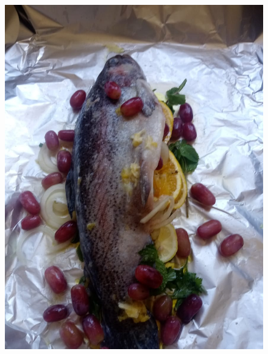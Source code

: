 \begin{figure}[H]
    \includegraphics[scale=0.15]{recipes/soula_4.jpg} \\ \vspace{0.2cm}

\end{figure}
